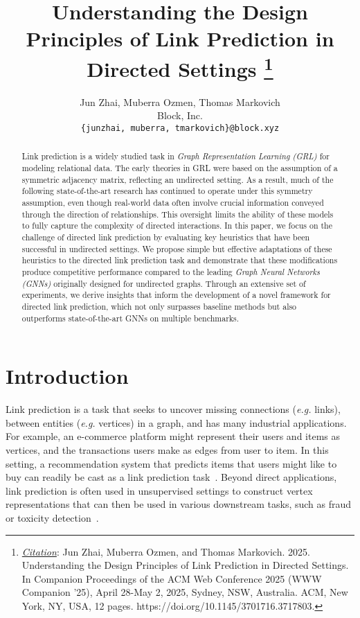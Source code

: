 \documentclass{article}
\title{Understanding the Design Principles of Link Prediction in Directed Settings
\thanks{\textit{\underline{Citation}}: 
Jun Zhai, Muberra Ozmen, and Thomas Markovich. 2025. Understanding the Design Principles of Link Prediction in Directed Settings. In Companion Proceedings of the ACM Web Conference 2025 (WWW Companion ’25), April 28-May 2, 2025, Sydney, NSW, Australia. ACM, New York, NY, USA, 12 pages. https://doi.org/10.1145/3701716.3717803.}}
\author{
  Jun Zhai, Muberra Ozmen, Thomas Markovich \\
  Block, Inc. \\
  \texttt{\{junzhai, muberra, tmarkovich\}@block.xyz} \\
}
\begin{document}
\maketitle

\begin{abstract}
    Link prediction is a widely studied task in \emph{Graph Representation Learning (GRL)} for modeling relational data. The early theories in GRL were based on the assumption of a symmetric adjacency matrix, reflecting an undirected setting. As a result, much of the following state-of-the-art research has continued to operate under this symmetry assumption, even though real-world data often involve crucial information conveyed through the direction of relationships. This oversight limits the ability of these models to fully capture the complexity of directed interactions. In this paper, we focus on the challenge of directed link prediction by evaluating key heuristics that have been successful in undirected settings. We propose simple but effective adaptations of these heuristics to the directed link prediction task and demonstrate that these modifications produce competitive performance compared to the leading \emph{Graph Neural Networks (GNNs)} originally designed for undirected graphs. Through an extensive set of experiments, we derive insights that inform the development of a novel framework for directed link prediction, which not only surpasses baseline methods but also outperforms state-of-the-art GNNs on multiple benchmarks.
\end{abstract}

\section{Introduction}\label{sec:introduction}
Link prediction is a task that seeks to uncover missing connections (\textit{e.g.} links), between entities (\textit{e.g.} vertices) in a graph, and has many industrial applications. For example, an e-commerce platform might represent their users and items as vertices, and the transactions users make as edges from user to item. In this setting, a recommendation system that predicts items that users might like to buy can readily be cast as a link prediction task~\citep{chamberlain2022graph, wang2023structure}. Beyond direct applications, link prediction is often used in unsupervised settings to construct vertex representations that can then be used in various downstream tasks, such as fraud or toxicity detection~\citep{pal2020pinnersage, el2022twhin, liu2020alleviating, zhang2022efraudcom}.
\end{document}
